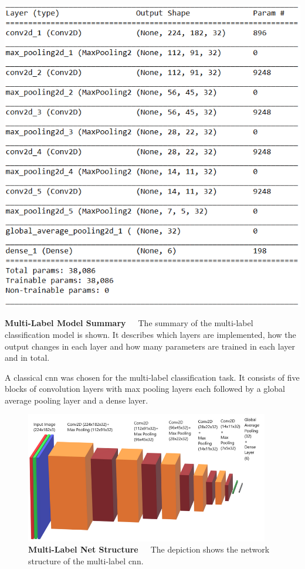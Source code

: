 \begin{table}[!htb]
	\centering
	\includegraphics[scale=0.8]{Figures/chapter04/multilabel_structure.png}
	\decoRule
	\caption[Multi-Label Model Summary]{\textbf{Multi-Label Model Summary}~~~The summary of the multi-label classification model is shown. It describes which layers are implemented, how the output changes in each layer and how many parameters are trained in each layer and in total.}
	\label{tab:MultilabelStructure}
\end{table}

\bigskip
A classical \acrshort{cnn} was chosen for the multi-label classification task. It consists of five blocks of convolution layers with max pooling layers each followed by a global average pooling layer and a dense layer.

\begin{figure}[!htb]
	\centering
	\includegraphics[width=0.95\textwidth]{Figures/chapter04/multilabel_net_structure.png}
	\decoRule
	\caption[Multi-Label Net Structure]{\textbf{Multi-Label Net Structure}~~~The depiction shows the network structure of the multi-label \acrshort{cnn}.}
	\label{tab:MultilabelNetStructure}
\end{figure}

